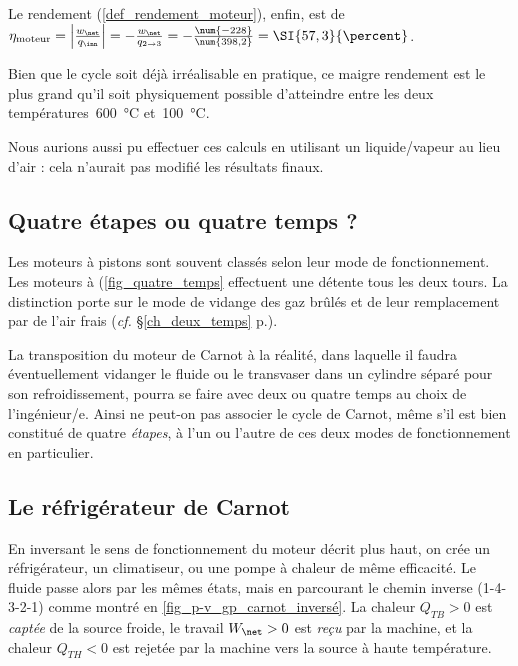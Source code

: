 \begin{anexample}
\begin{answer}
				 	Le rendement (\ref{def_rendement_moteur}), enfin, est de $\eta_\text{moteur}
				 	= \left|\frac{w_\net}{q_\inn}\right|
				 	= -\frac{w_\net}{q_{2 \to 3}}
				 	= -\frac{\num{-228}}{\num{398,2}} = \SI{57,3}{\percent}$.
				 		\begin{remark}Bien que le cycle soit déjà irréalisable en pratique, ce maigre rendement est le plus grand qu’il soit physiquement possible d’atteindre entre les deux températures~\SI{600}{\degreeCelsius} et~\SI{100}{\degreeCelsius}.\end{remark}
				 		\begin{remark}Nous aurions aussi pu effectuer ces calculs en utilisant un liquide/vapeur au lieu d’air : cela n’aurait pas modifié les résultats finaux.\end{remark}
				 \end{answer}
		\end{anexample}
		

	\subsection{Quatre étapes ou quatre temps ?}
	
		Les moteurs à pistons sont souvent classés selon leur mode de fonctionnement. Les moteurs à  (\cref{fig_quatre_temps} effectuent une détente tous les deux tours. La distinction porte sur le mode de vidange des gaz brûlés et de leur remplacement par de l’air frais (\textit{cf.} \S\ref{ch_deux_temps} p.\pageref{ch_deux_temps}).
		
		La transposition du moteur de Carnot à la réalité, dans laquelle il faudra éventuellement vidanger le fluide ou le transvaser dans un cylindre séparé pour son refroidissement, pourra se faire avec deux ou quatre temps au choix de l’ingénieur/e. Ainsi ne peut-on pas associer le cycle de Carnot, même s’il est bien constitué de quatre \emph{étapes}, à l’un ou l’autre de ces deux modes de fonctionnement en particulier.
		

	\subsection{Le réfrigérateur de Carnot}

		En inversant le sens de fonctionnement du moteur décrit plus haut, on crée un réfrigérateur, un climatiseur, ou une pompe à chaleur de même efficacité. Le fluide passe alors par les mêmes états, mais en parcourant le chemin inverse (1-4-3-2-1) comme montré en \cref{fig_p-v_gp_carnot_inversé}. La chaleur $Q_{TB} > 0$ est \emph{captée} de la source froide, le travail $W_\net > 0$ est \emph{reçu} par la machine, et la chaleur $Q_{TH} < 0$ est rejetée par la machine vers la source à haute température.

